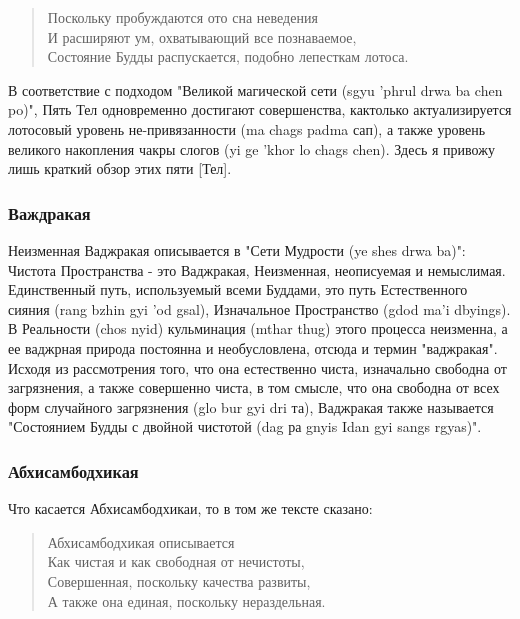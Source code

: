 \begin{verse}
Поскольку пробуждаются ото сна неведения\\
И расширяют ум, охватывающий все познаваемое,\\
Состояние Будды распускается, подобно лепесткам лотоса.
\end{verse}

В соответствие с подходом "Великой магической сети (sgyu 'phrul drwa ba chen po)",
Пять Тел одновременно достигают совершенства, кактолько актуализируется лотосовый
уровень не-привязанности (ma chags padma сап), а также уровень великого накопления
чакры слогов (yi ge 'khor lo chags chen). Здесь я привожу лишь краткий обзор этих пяти [Тел].\\

\subsubsection{Важдракая}

Неизменная Ваджракая описывается в "Сети Мудрости (ye shes drwa ba)":
Чистота Пространства - это Ваджракая,
Неизменная, неописуемая и немыслимая.
Единственный путь, используемый всеми Буддами, это путь Естественного сияния
(rang bzhin gyi 'od gsal), Изначальное Пространство (gdod ma'i dbyings). В Реальности (chos
nyid) кульминация (mthar thug) этого процесса неизменна, а ее ваджрная природа постоянна
и необусловлена, отсюда и термин "ваджракая". Исходя из рассмотрения того, что она
естественно чиста, изначально свободна от загрязнения, а также совершенно чиста, в том
смысле, что она свободна от всех форм случайного загрязнения (glo bur gyi dri та),
Ваджракая также называется "Состоянием Будды с двойной чистотой (dag ра gnyis Idan gyi
sangs rgyas)".

\subsubsection{Абхисамбодхикая}

Что касается Абхисамбодхикаи, то в том же тексте сказано:

\begin{verse}
Абхисамбодхикая описывается\\
Как чистая и как свободная от нечистоты,\\
Совершенная, поскольку качества развиты,\\
А также она единая, поскольку нераздельная.
\end{verse}

